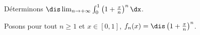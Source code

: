 \documentclass[a4paper,10pt]{report}
\begin{document}
\begin{ex} Déterminons $\dis \lim_{n \rightarrow + \infty} \int_{0}^1 \left( 1 + \frac{x}{n}\right)^n \dx$.

\medskip

\noindent Posons pour tout $n \geq 1$ et $x \in [0,1]$, $f_n(x) = \dis \left( 1 + \frac{x}{n}\right)^n$.

%
%
%
%
%

\end{ex}
\end{document}
